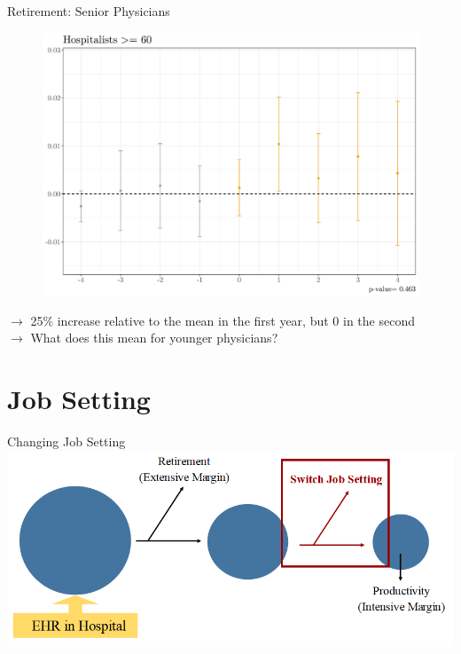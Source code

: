 \documentclass[10pt]{beamer}
\begin{document}
\begin{frame}{Retirement: Senior Physicians}
\begin{figure}[ht]
    \centering
    \includegraphics[scale=.35]{Objects/Presentation_retire_old.pdf}
\end{figure}
$\rightarrow$ 25\% increase relative to the mean in the first year, but 0 in the second\\
$\rightarrow$ What does this mean for younger physicians?
\end{frame}





\section{Job Setting}




\begin{frame}{Changing Job Setting}
    \centering
    \includegraphics[scale=.5]{Objects/EHR_FlowChart_JobSwitch.PNG}
\end{frame}
\end{document}
